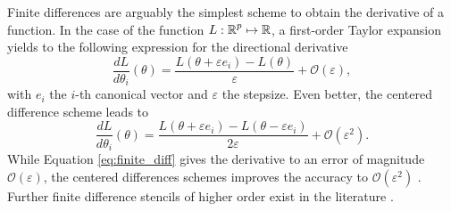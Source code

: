 Finite differences are arguably the simplest scheme to obtain the derivative of a function. 
In the case of the function $L : \operatorname{\mathbb{R}}^p \mapsto \operatorname{\mathbb{R}}$, a first-order Taylor expansion yields to the following expression for the directional derivative
\begin{equation}
 \frac{dL}{d\theta_i} (\theta) = \frac{L(\theta + \varepsilon e_i ) - L(\theta)}{\varepsilon} + \mathcal O (\varepsilon),
 \label{eq:finite_diff}
\end{equation}
with $e_i$ the $i$-th canonical vector and $\varepsilon$ the stepsize. 
Even better, the centered difference scheme leads to
\begin{equation}
 \frac{dL}{d\theta_i} (\theta) 
 =
 \frac{L(\theta + \varepsilon e_i ) - L(\theta - \varepsilon e_i)}{2\varepsilon}
 + \mathcal O (\varepsilon^2).
 \label{eq:finite_diff2}
\end{equation}
While Equation \eqref{eq:finite_diff} gives the derivative to an error of magnitude $\mathcal O (\varepsilon)$, the centered differences schemes improves the accuracy to $\mathcal O (\varepsilon^2)$ \cite{ascher2008-numerical-methods}. 
Further finite difference stencils of higher order exist in the literature \cite{Fornberg1988}. 
 
